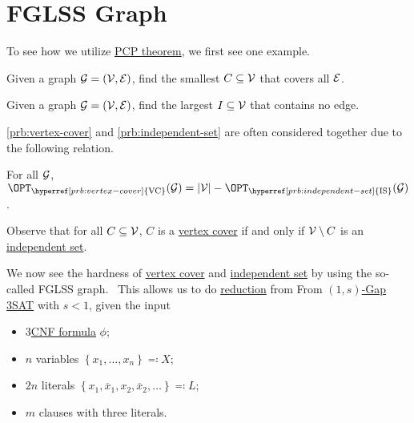 \section{FGLSS Graph}
To see how we utilize \hyperref[thm:PCP]{PCP theorem}, we first see one example.
\begin{problem}\label{prb:vertex-cover}
Given a graph \(\mathcal{\MakeUppercase{g}} =(\mathcal{\MakeUppercase{v}} , \mathcal{\MakeUppercase{e}} )\), find the smallest \(C \subseteq \mathcal{\MakeUppercase{v}} \) that covers all \(\mathcal{\MakeUppercase{e}} \).
\end{problem}

\begin{problem}\label{prb:independent-set}
Given a graph \(\mathcal{\MakeUppercase{g}} =(\mathcal{\MakeUppercase{v}} , \mathcal{\MakeUppercase{e}} )\), find the largest \(I \subseteq \mathcal{\MakeUppercase{v}} \) that contains no edge.
\end{problem}

\autoref{prb:vertex-cover} and \autoref{prb:independent-set} are often considered together due to the following relation.

\begin{claim}
	For all \(\mathcal{\MakeUppercase{g}} \), \(\OPT_{\hyperref[prb:vertex-cover]{\text{VC}}}(\mathcal{\MakeUppercase{g}} ) = \vert \mathcal{\MakeUppercase{v}} \vert - \OPT_{\hyperref[prb:independent-set]{\text{IS}}}(\mathcal{\MakeUppercase{g}} )\).
\end{claim}
\begin{explanation}
	Observe that for all \(C \subseteq \mathcal{\MakeUppercase{v}} \), \(C\) is a \hyperref[prb:vertex-cover]{vertex cover} if and only if \(\mathcal{\MakeUppercase{v}} \setminus C\) is an \hyperref[prb:independent-set]{independent set}.
\end{explanation}

We now see the hardness of \hyperref[prb:vertex-cover]{vertex cover} and \hyperref[prb:independent-set]{independent set} by using the so-called FGLSS graph.~\cite{10.1145/226643.226652} This allows us to do \hyperref[def:reduction]{reduction} from From \hyperref[def:c-s-Gap]{\((1, s)\)-Gap} \hyperref[prb:max-3SAT]{3SAT} with \(s < 1\), given the input
\begin{itemize}
	\item \hyperref[def:k-CNF]{\(3\)CNF formula} \(\phi \);
	\item \(n\) variables \(\left\{ x_1, \ldots , x_n\right\} \eqqcolon X\);
	\item \(2n\) literals \(\left\{ x_1, \overline{x}_1, x_2, \overline{x}_2, \ldots \right\} \eqqcolon L\);
	\item \(m\) clauses with three literals.
\end{itemize}

